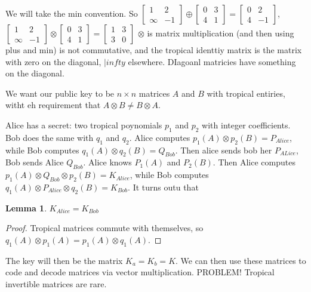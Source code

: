 \documentclass[11pt]{article}
\newtheorem{protolemma}[prototheorem]{Lemma}
\newenvironment{lemma}
   {\begin{protolemma}}
   {\end{protolemma}}
\theoremstyle{definition}
\begin{document}
We will take the min convention. So $\begin{bmatrix}
    1 & 2 \\ \infty & -1
\end{bmatrix}\oplus \begin{bmatrix}
    0 & 3 \\ 4 & 1
\end{bmatrix}= \begin{bmatrix}
    0 & 2 \\ 4 & -1
\end{bmatrix}$, $\begin{bmatrix}
    1 & 2 \\ \infty & -1
\end{bmatrix}\otimes \begin{bmatrix}
    0 & 3 \\ 4 & 1
\end{bmatrix}= \begin{bmatrix}
    1 & 3 \\ 3 & 0
\end{bmatrix}$ $\otimes$ is matrix multiplication (and then using plus and min) is not commutative, and the tropical identtiy matrix is the matrix with zero on the diagonal, $|infty$ elsewhere. DIagoanl matricies have something on the diagonal.


We want our public key to be $n \times n$ matrices $A$ and $B$ with tropical entiries, witht eh requirement that $A \otimes B \neq B \otimes A$.


Alice has a secret: two tropical poynomials $p_1$ and $p_2$ with integer coefficients. Bob  does the same with $q_1$ and $q_2$. Alice computes $p_1(A) \otimes p_2(B)=P_{Alice}$, while Bob computes $q_1(A)\otimes q_2(B)=Q_{Bob}$. Then alice sends bob her $P_{ALice}$, Bob sends Alice $Q_{Bob}$. Alice knows $P_1(A)$ and $P_2(B)$. Then Alice computes $p_1(A) \otimes Q_{Bob}\otimes p_2(B)=K_{Alice}$, while Bob computes $q_1(A) \otimes P_{Alice} \otimes q_2(B)=K_{Bob}$. It turns outu that 

\begin{lemma}
    $K_{Alice}=K_{Bob}$
\end{lemma}

\begin{proof}
    Tropical matrices commute with themselves, so $q_1(A)\otimes p_1(A)= p_1(A) \otimes q_1(A)$.
\end{proof}



The key will then be the matrix $K_a=K_b=K$. We can then use these matrices to code and decode matrices via vector multiplication. PROBLEM! Tropical invertible matrices are rare.
\end{document}
